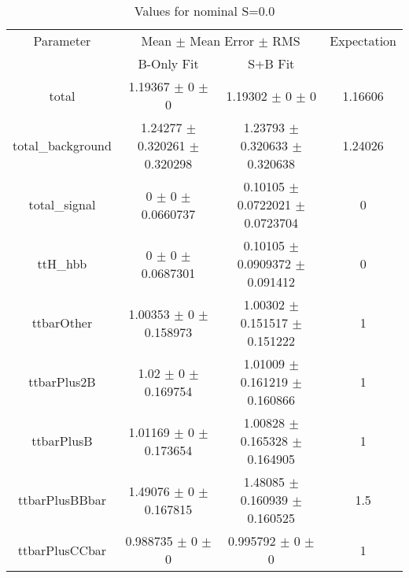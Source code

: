 \begin{table}
\centering
\caption{Values for nominal S=0.0}
\begin{tabular}{cccc}
\toprule
Parameter & \multicolumn{2}{c}{Mean $\pm$ Mean Error $\pm$ RMS} & Expectation\\
 & B-Only Fit & S+B Fit & \\
\midrule
total & \num{1.19367} $\pm$ \num{0} $\pm$ \num{0} & \num{1.19302} $\pm$ \num{0} $\pm$ \num{0} & \num{1.16606}\\
total\_background & \num{1.24277} $\pm$ \num{0.320261} $\pm$ \num{0.320298} & \num{1.23793} $\pm$ \num{0.320633} $\pm$ \num{0.320638} & \num{1.24026}\\
total\_signal & \num{0} $\pm$ \num{0} $\pm$ \num{0.0660737} & \num{0.10105} $\pm$ \num{0.0722021} $\pm$ \num{0.0723704} & \num{0}\\
ttH\_hbb & \num{0} $\pm$ \num{0} $\pm$ \num{0.0687301} & \num{0.10105} $\pm$ \num{0.0909372} $\pm$ \num{0.091412} & \num{0}\\
ttbarOther & \num{1.00353} $\pm$ \num{0} $\pm$ \num{0.158973} & \num{1.00302} $\pm$ \num{0.151517} $\pm$ \num{0.151222} & \num{1}\\
ttbarPlus2B & \num{1.02} $\pm$ \num{0} $\pm$ \num{0.169754} & \num{1.01009} $\pm$ \num{0.161219} $\pm$ \num{0.160866} & \num{1}\\
ttbarPlusB & \num{1.01169} $\pm$ \num{0} $\pm$ \num{0.173654} & \num{1.00828} $\pm$ \num{0.165328} $\pm$ \num{0.164905} & \num{1}\\
ttbarPlusBBbar & \num{1.49076} $\pm$ \num{0} $\pm$ \num{0.167815} & \num{1.48085} $\pm$ \num{0.160939} $\pm$ \num{0.160525} & \num{1.5}\\
ttbarPlusCCbar & \num{0.988735} $\pm$ \num{0} $\pm$ \num{0} & \num{0.995792} $\pm$ \num{0} $\pm$ \num{0} & \num{1}\\
\bottomrule
\end{tabular}
\end{table}